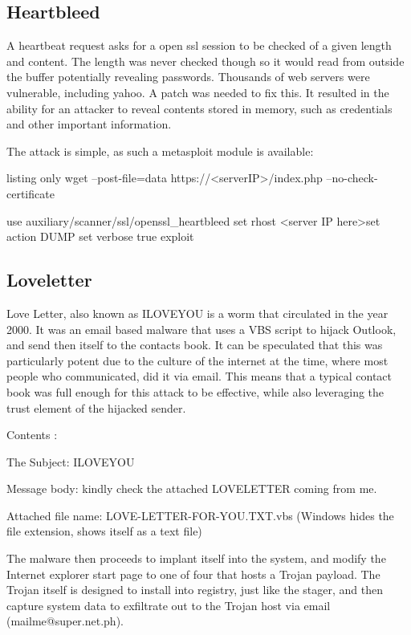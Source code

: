 \subsection{Heartbleed}
A heartbeat request asks for a open ssl session to be checked of a given length and content. 
The length was never checked though so it would read from outside the buffer potentially revealing passwords. Thousands of web servers were vulnerable, 
including yahoo. A patch was needed to fix this. It resulted in the ability for an attacker to reveal contents stored in memory, such as credentials and other important information.

The attack is simple, as such a metasploit module is available:
\begin{tcblisting}{listing only}
wget --post-file=data https://<serverIP>/index.php --no-check-certificate

use auxiliary/scanner/ssl/openssl_heartbleed
set rhost <server IP here>set action DUMP
set verbose true
exploit
\end{tcblisting}

\subsection{Loveletter}
Love Letter, also known as ILOVEYOU is a worm that circulated in the year 2000. It was an email based malware that uses a VBS script to hijack Outlook, and send then itself to the contacts book. \citep{Loveletter}
It can be speculated that this was particularly potent due to the culture of the internet at the time, where most people who communicated, did it via email. This means that a typical contact book was full enough for this attack to be effective, while also leveraging
the trust element of the hijacked sender.

Contents \citep{Loveletter}:

The Subject:          ILOVEYOU

Message body:         kindly check the attached LOVELETTER coming from me.

Attached file name:   LOVE-LETTER-FOR-YOU.TXT.vbs (Windows hides the file extension, shows itself as a text file)

The malware then proceeds to implant itself into the system, and modify the Internet explorer start page to one of four that hosts a Trojan payload. The Trojan itself is designed to install into registry, just like the stager, and then capture system data to exfiltrate out to the Trojan host via email (mailme@super.net.ph). \citep{loveletter}

